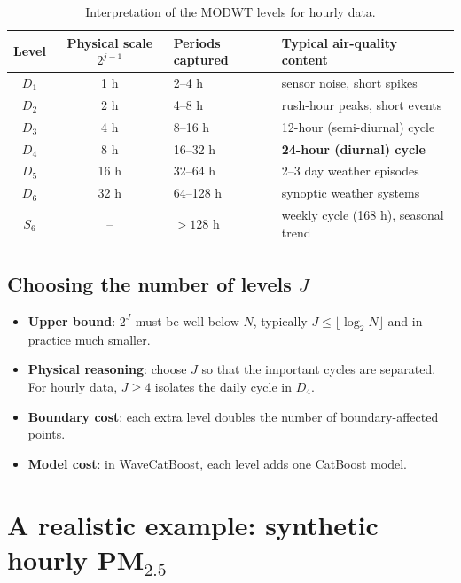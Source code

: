\documentclass[11pt,a4paper]{article}
\begin{document}
\begin{table}[H]
\centering
\begin{tabular}{cclp{6.5cm}}
\toprule
Level & Physical scale $2^{j-1}$ & Periods captured & Typical air-quality content \\
\midrule
$D_1$ & 1 h & 2--4 h & sensor noise, short spikes \\
$D_2$ & 2 h & 4--8 h & rush-hour peaks, short events \\
$D_3$ & 4 h & 8--16 h & 12-hour (semi-diurnal) cycle \\
$D_4$ & 8 h & 16--32 h & \textbf{24-hour (diurnal) cycle} \\
$D_5$ & 16 h & 32--64 h & 2--3 day weather episodes \\
$D_6$ & 32 h & 64--128 h & synoptic weather systems \\
$S_6$ & -- & $>128$ h & weekly cycle (168 h), seasonal trend \\
\bottomrule
\end{tabular}
\caption{Interpretation of the MODWT levels for hourly data.}
\label{tab:levels}
\end{table}

\subsection{Choosing the number of levels $J$}

\begin{itemize}[leftmargin=1.5em]
  \item \textbf{Upper bound}: $2^J$ must be well below $N$, typically $J\le\lfloor\log_2 N\rfloor$ and in practice much smaller.
  \item \textbf{Physical reasoning}: choose $J$ so that the important cycles are separated. For hourly data, $J\ge4$ isolates
        the daily cycle in $D_4$.
  \item \textbf{Boundary cost}: each extra level doubles the number of boundary-affected points.
  \item \textbf{Model cost}: in WaveCatBoost, each level adds one CatBoost model.
\end{itemize}

\section{A realistic example: synthetic hourly PM$_{2.5}$}
\end{document}
